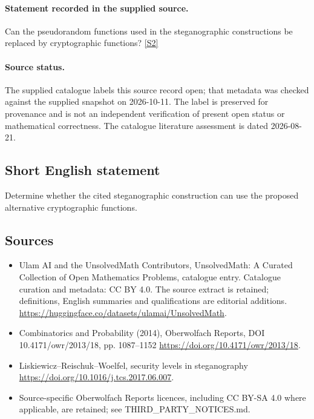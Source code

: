 \documentclass[11pt]{article}
\begin{document}
\paragraph{Statement recorded in the supplied source.}
Can the pseudorandom functions used in the steganographic constructions be replaced by cryptographic functions? \href{https://doi.org/10.4171/owr/2013/18}{[S2]}
\paragraph{Source status.}
The supplied catalogue labels this source record open; that metadata was checked against the supplied snapshot on 2026-10-11. The label is preserved for provenance and is not an independent verification of present open status or mathematical correctness. The catalogue literature assessment is dated 2026-08-21.
\subsection{Short English statement}
Determine whether the cited steganographic construction can use the proposed alternative cryptographic functions.
\subsection{Sources}
\begin{itemize}
\item[S1] Ulam AI and the UnsolvedMath Contributors, UnsolvedMath: A Curated Collection of Open Mathematics Problems, catalogue entry. Catalogue curation and metadata: CC BY 4.0. The source extract is retained; definitions, English summaries and qualifications are editorial additions.
\url{https://huggingface.co/datasets/ulamai/UnsolvedMath}.
\item[S2] Combinatorics and Probability (2014), Oberwolfach Reports, DOI 10.4171/owr/2013/18, pp. 1087--1152
\url{https://doi.org/10.4171/owr/2013/18}.
\item[S3] Liskiewicz--Reischuk--Woelfel, security levels in steganography
\url{https://doi.org/10.1016/j.tcs.2017.06.007}.
\item Source-specific Oberwolfach Reports licences, including CC BY-SA 4.0 where applicable, are retained; see THIRD\_PARTY\_NOTICES.md.
\end{itemize}
\end{document}
